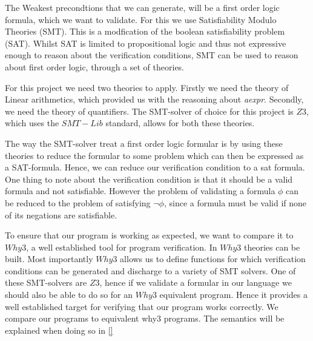 
The Weakest precondtions that we can generate, will be a first order logic formula, which we want to validate. For this we use Satisfiability Modulo Theories (SMT). This is a modfication of the boolean satisfiability problem (SAT). Whilst SAT is limited to propositional logic and thus not expressive enough to reason about the verification conditions, SMT can be used to reason about first order logic, through a set of theories.


For this project we need two theories to apply. Firstly we need the theory of Linear arithmetics, which provided us with the reasoning about \textit{aexpr}. Secondly, we need the theory of quantifiers. The SMT-solver of choice for this project is $Z3$, which uses the $SMT-Lib$ standard, allows for both these theories.

The way the SMT-solver treat a first order logic formular is by using these theories to reduce the formular to some problem which can then be expressed as a SAT-formula. Hence, we can reduce our verification condition to a sat formula.
One thing to note about the verification condition is that it should be a valid formula and not satisfiable. However the problem of validating a formula $\phi$ can be reduced to the problem of satisfying $\neg \phi$, since a formula must be valid if none of its negations are satisfiable.

To ensure that our program is working as expected, we want to compare it to $Why3$, a well established tool for program verification.
In $Why3$ theories can be built. Most importantly $Why3$ allows us to define functions for which verification conditions can be generated and discharge to a variety of SMT solvers. One of these SMT-solvers are $Z3$, hence if we validate a formular in our language we should also be able to do so for an $Why3$ equivalent program. Hence it provides a well established target for verifying that our program works correctly. We compare our programs to equivalent why3 programs. The semantics will be explained when doing so in \cref{}


